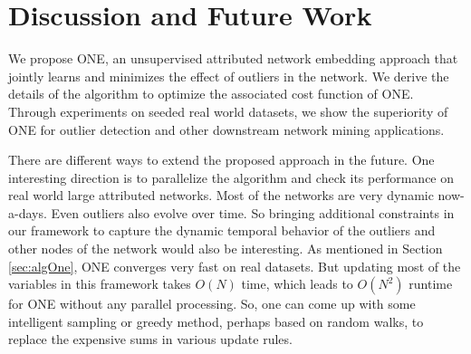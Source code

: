 \documentclass[letterpaper]{article} %
\begin{document}



\section{Discussion and Future Work}
We propose ONE, an unsupervised attributed network embedding approach that jointly learns and minimizes the effect of outliers in the network. We derive the details of the algorithm to optimize the associated cost function of ONE. Through experiments on seeded real world datasets, we show the superiority of ONE for outlier detection and other downstream network mining applications.

There are different ways to extend the proposed approach in the future. One interesting direction is to parallelize the algorithm and check its performance on real world large attributed networks. Most of the networks are very dynamic now-a-days. Even outliers also evolve over time. So bringing additional constraints in our framework to capture the dynamic temporal behavior of the outliers and other nodes of the network would also be interesting. As mentioned in Section \ref{sec:algOne}, ONE converges very fast on real datasets. But updating most of the variables in this framework takes $O(N)$ time, which leads to $O(N^2)$ runtime for ONE without any parallel processing. So, one can come up with some intelligent sampling or greedy method, perhaps based on random walks, to replace the expensive sums in various update rules.

{\footnotesize

}
\end{document}

